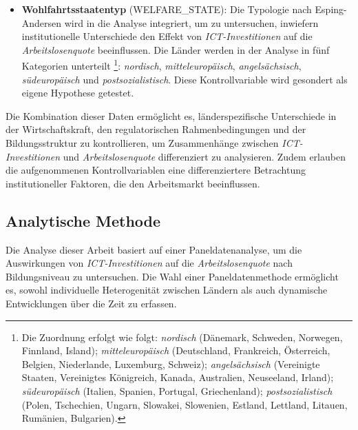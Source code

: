 \begin{itemize}
    \item \textbf{Wohlfahrtsstaatentyp} (WELFARE\_STATE): Die Typologie nach Esping-Andersen 
    \parencite{espingandersen1990thethree} wird in die Analyse integriert, um zu untersuchen, 
    inwiefern institutionelle Unterschiede den Effekt von \textit{\ac{ICT}-Investitionen} auf 
    die \textit{Arbeitslosenquote} beeinflussen. Die Länder werden in der Analyse in fünf 
    Kategorien unterteilt
    \footnote{
        Die Zuordnung erfolgt wie folgt: 
        \textit{nordisch} (Dänemark, Schweden, Norwegen, Finnland, Island); 
        \textit{mitteleuropäisch} (Deutschland, Frankreich, Österreich, Belgien, Niederlande, 
        Luxemburg, Schweiz); 
        \textit{angelsächsisch} 
        (Vereinigte Staaten, Vereinigtes Königreich, Kanada, Australien, Neuseeland, Irland); 
        \textit{südeuropäisch} (Italien, Spanien, Portugal, Griechenland); 
        \textit{postsozialistisch} (Polen, Tschechien, Ungarn, Slowakei, Slowenien, Estland, 
        Lettland, Litauen, Rumänien, Bulgarien).
    }: \textit{nordisch}, \textit{mitteleuropäisch}, \textit{angelsächsisch}, 
    \textit{südeuropäisch} und \textit{postsozialistisch}. Diese Kontrollvariable wird gesondert 
    als eigene Hypothese getestet.

\end{itemize}

Die Kombination dieser Daten ermöglicht es, länderspezifische Unterschiede in der 
Wirtschaftskraft, den regulatorischen Rahmenbedingungen und der Bildungsstruktur zu 
kontrollieren, um Zusammenhänge zwischen \textit{\ac{ICT}-Investitionen} und 
\textit{Arbeitslosenquote} differenziert zu analysieren. Zudem erlauben die aufgenommenen 
Kontrollvariablen eine differenziertere Betrachtung institutioneller Faktoren, die den 
Arbeitsmarkt beeinflussen. 


\subsection{Analytische Methode}

Die Analyse dieser Arbeit basiert auf einer Paneldatenanalyse, um die Auswirkungen von 
\textit{\ac{ICT}-Investitionen} auf die \textit{Arbeitslosenquote} nach Bildungsniveau zu 
untersuchen. Die Wahl einer Paneldatenmethode ermöglicht es, sowohl individuelle Heterogenität 
zwischen Ländern als auch dynamische Entwicklungen über die Zeit zu erfassen. 

